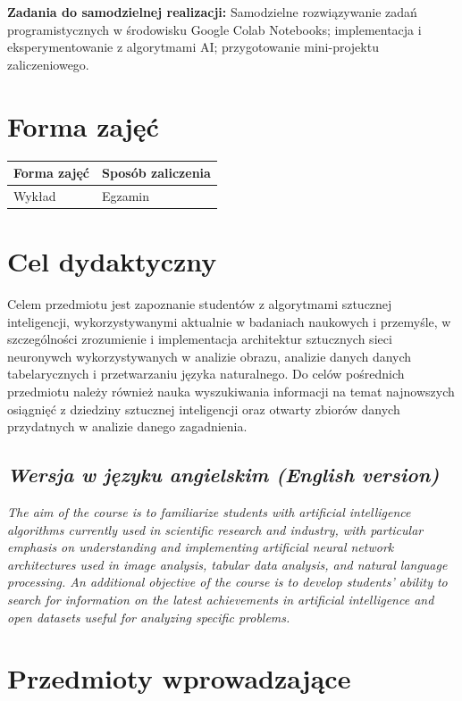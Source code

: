 \documentclass[12pt, a4paper]{article}
\begin{document}
\vspace{4pt}
\noindent\textbf{Zadania do samodzielnej realizacji:} Samodzielne rozwiązywanie zadań programistycznych w środowisku Google Colab Notebooks; implementacja i eksperymentowanie z algorytmami AI; przygotowanie mini-projektu zaliczeniowego.

\section{Forma zajęć}

\begin{tabular}{ll}
  \hline
  \textbf{Forma zajęć} & \textbf{Sposób zaliczenia} \\
  \hline
  Wykład & Egzamin \\
  \hline
\end{tabular}

\section{Cel dydaktyczny}

Celem przedmiotu jest zapoznanie studentów z algorytmami sztucznej inteligencji, wykorzystywanymi aktualnie w badaniach naukowych i przemyśle, w szczególności zrozumienie i implementacja architektur sztucznych sieci neuronywch wykorzystywanych w analizie obrazu, analizie danych danych tabelarycznych i przetwarzaniu języka naturalnego. Do celów pośrednich przedmiotu należy również nauka wyszukiwania informacji na temat najnowszych osiągnięć z dziedziny sztucznej inteligencji oraz otwarty zbiorów danych przydatnych w analizie danego zagadnienia.

\subsection*{\textit{Wersja w języku angielskim (English version)}}

\textit{The aim of the course is to familiarize students with artificial intelligence algorithms currently used in scientific research and industry, with particular emphasis on understanding and implementing artificial neural network architectures used in image analysis, tabular data analysis, and natural language processing. An additional objective of the course is to develop students’ ability to search for information on the latest achievements in artificial intelligence and open datasets useful for analyzing specific problems.}


\section{Przedmioty wprowadzające}
\end{document}
